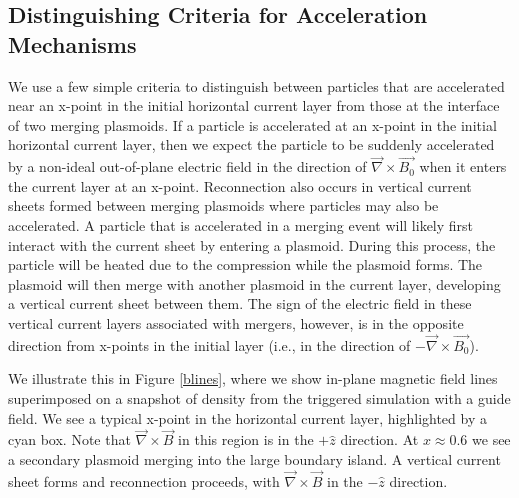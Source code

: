 \documentclass[iop,twocolappendix]{emulateapj}
\begin{document}
\subsection{Distinguishing Criteria for Acceleration Mechanisms} \label{acc_mec_def}
We use a few simple criteria to distinguish between particles that are accelerated near an x-point in the initial horizontal current layer from those at the interface of two merging plasmoids.
If a particle is accelerated at an x-point in the initial horizontal current layer, then we expect the particle to be suddenly accelerated by a non-ideal out-of-plane electric field in the direction of $\vec{\nabla} \times \vec{B_{0}}$ when it enters the current layer at an x-point.  Reconnection also occurs in vertical current sheets formed between merging plasmoids where particles may also be accelerated.  A particle that is accelerated in a merging event will likely first interact with the current sheet by entering a plasmoid.  During this process, the particle will be heated due to the compression while the plasmoid forms.  The plasmoid will then merge with another plasmoid in the current layer, developing a vertical current sheet between them.  The sign of the electric field in these vertical current layers associated with mergers, however, is in the opposite direction from x-points in the initial layer (i.e., in the direction of $-\vec{\nabla} \times \vec{B_{0}}$).  

We illustrate this in Figure \ref{blines}, where we show in-plane magnetic field lines superimposed on a snapshot of density from the triggered simulation with a guide field.  We see a typical x-point in the horizontal current layer, highlighted by a cyan box.  Note that $\vec{\nabla} \times \vec{B}$ in this region is in the $+\hat{z}$ direction.  At $x\approx0.6$ we see a secondary plasmoid merging into the large boundary island.  A vertical current sheet forms and reconnection proceeds, with $\vec{\nabla} \times \vec{B}$  in the $-\hat{z}$ direction.
\end{document}

